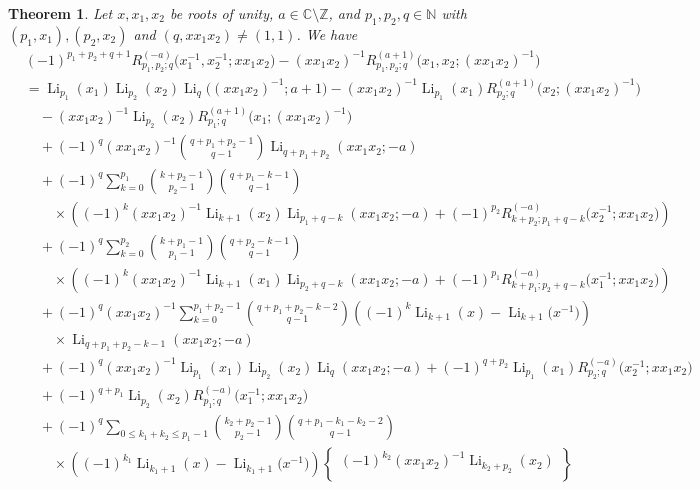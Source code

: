 \documentclass[11pt]{article}
\DeclareMathOperator{\Li}{Li}
\def\N{\mathbb{N}}
\def\Z{\mathbb{Z}}
\theoremstyle{plain}
\newtheorem{thm}{Theorem}[section]
\theoremstyle{definition}
\begin{document}
\begin{thm}\label{thm-quadratic-CES-three} Let $x,x_1,x_2$ be roots of unity, $a\in \mathbb{C}\setminus \Z$, and $p_1,p_2,q\in\N$ with $(p_1,x_1), (p_2,x_2) $ and $ (q,xx_1x_2)\neq (1,1)$. We have
	\begin{align}
	&(-1)^{p_1+p_2+q+1}R_{p_1,p_2;q}^{(-a)}\Big(x_1^{-1},x_2^{-1};xx_1x_2\Big)-(xx_1x_2)^{-1}R^{(a+1)}_{p_1,p_2;q}\Big(x_1,x_2;(xx_1x_2)^{-1}\Big)\nonumber\\
	&=\Li_{p_1}(x_1)\Li_{p_2}(x_2)\Li_q\Big((xx_1x_2)^{-1};a+1\Big)-(xx_1x_2)^{-1}\Li_{p_1}(x_1)R^{(a+1)}_{p_2;q}\Big(x_2;(xx_1x_2)^{-1}\Big)\nonumber\\
	&\quad-(xx_1x_2)^{-1}\Li_{p_2}(x_2)R^{(a+1)}_{p_1;q}\Big(x_1;(xx_1x_2)^{-1}\Big)\nonumber\\
	&\quad+(-1)^q(xx_1x_2)^{-1}\binom{q+p_1+p_2-1}{q-1}\Li_{q+p_1+p_2}(xx_1x_2;-a)\nonumber\\
	&\quad+(-1)^q\sum_{k=0}^{p_{1}}\binom{k+p_2-1}{p_{2}-1}\binom{q+p_{1}-k-1}{q-1}\nonumber\\
	&\quad\quad\times\left((-1)^k(xx_1x_2)^{-1}\Li_{k+1}(x_{2})\Li_{p_1+q-k}(xx_1x_{2};-a)+(-1)^{p_{2}}R_{k+p_2;p_1+q-k}^{(-a)}\Big(x_2^{-1};xx_1x_2\Big)\right)\nonumber\\
	&\quad+(-1)^q\sum_{k=0}^{p_{2}}\binom{k+p_1-1}{p_{1}-1}\binom{q+p_{2}-k-1}{q-1}\nonumber\\
	&\quad\quad\times\left((-1)^k(xx_1x_2)^{-1}\Li_{k+1}(x_{1})\Li_{p_2+q-k}(xx_1x_{2};-a)+(-1)^{p_{1}}R_{k+p_1;p_2+q-k}^{(-a)}\Big(x_1^{-1};xx_1x_2\Big)\right)\nonumber\\
	&\quad+(-1)^q(xx_1x_2)^{-1}\sum_{k=0}^{p_1+p_2-1}\binom{q+p_1+p_2-k-2}{q-1}\left((-1)^k\Li_{k+1}(x)-\Li_{k+1}\Big(x^{-1}\Big)\right)\nonumber\\
	&\quad\quad\times\Li_{q+p_1+p_2-k-1}(xx_1x_2;-a)\nonumber\\
	&\quad+(-1)^q(xx_1x_2)^{-1}\Li_{p_1}(x_1)\Li_{p_2}(x_2)\Li_q(xx_1x_2;-a)+(-1)^{q+p_2}\Li_{p_1}(x_1)R_{p_2;q}^{(-a)}\Big(x_2^{-1};xx_1x_2\Big)\nonumber\\
	&\quad+(-1)^{q+p_1}\Li_{p_2}(x_2)R_{p_1;q}^{(-a)}\Big(x_1^{-1};xx_1x_2\Big)\nonumber\\
	&\quad+(-1)^q\sum_{0\le k_1+k_2\le p_{1}-1}\binom{k_2+p_{2}-1}{p_{2}-1}\binom{q+p_{1}-k_1-k_2-2}{q-1}\nonumber\\
	&\quad\quad\times\left((-1)^{k_1}\Li_{k_1+1}(x)-\Li_{k_1+1}\Big(x^{-1}\Big)\right)\begin{Bmatrix}
		(-1)^{k_2}(xx_1x_2)^{-1}\Li_{k_2+p_2}(x_{2})\\

\end{Bmatrix}
\end{align}
\end{thm}
\end{document}
